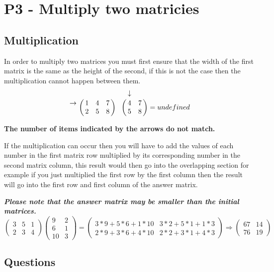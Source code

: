 \documentclass{article}
\begin{document}
\section{P3 - Multiply two matricies}
\subsection{Multiplication}

In order to multiply two matrices you must first ensure that the width of the first matrix is the same as the height of the second, if this is not the case then the multiplication cannot happen between them.
\[
\bordermatrix{~ & ~ & ~ & ~ \cr \rightarrow & 1 & 4 & 7 \cr ~ & 2 & 5 & 8 \cr}
\bordermatrix{~ & \downarrow & ~ \cr ~ & 4 & 7 \cr ~ & 5 & 8}
= undefined
\]
\begin{center} \small{ \textbf{The number of items indicated by the arrows do not match.\\}} \end{center}
If the multiplication can occur then you will have to add the values of each number in the first matrix row multiplied by its corresponding number in the second matrix column, this result would then go into the overlapping section for example if you just multiplied the first row by the first column then the result will go into the first row and first column of the answer matrix.

\textit{\textbf{Please note that the answer matrix may be smaller than the initial matrices.}}
\begin{equation*}
	\begin{pmatrix}
		3 & 5 & 1\\
		2 & 3 & 4
	\end{pmatrix}
	\begin{pmatrix}
		9 & 2\\
		6 & 1\\
		10 & 3
	\end{pmatrix}
	=
	\begin{pmatrix}
		3*9+5*6+1*10 & 3*2+5*1+1*3\\
		2*9+3*6+4*10 & 2*2+3*1+4*3
	\end{pmatrix}
	\Rightarrow
	\begin{pmatrix}
		67 & 14\\
		76 & 19
	\end{pmatrix}
\end{equation*}
\subsection{Questions}
\end{document}
